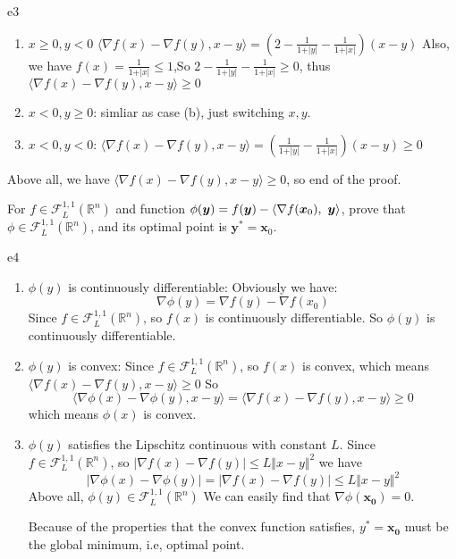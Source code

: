 \documentclass{article}
\newcommand{\xB}{\bm{x}}
\newcommand{\yB}{\bm{y}}
\newcommand{\RBB}{\mathbb{R}}
\newcommand{\FM}{\mathcal{F}}
\newcommand{\functiontype}[3]{\FM_{#1}^{#2,#3}(\RBB^n)}
\begin{document}
\begin{PROOF}{e3}
\begin{enumerate}
\begin{enumerate}
		\item $x\ge 0,y<0$
		$\langle\nabla f(x)-\nabla f(y),x-y\rangle=(2-\frac{1}{1+\vert y\vert}-\frac{1}{1+\vert x\vert})(x-y)$
		Also, we have $f(x)=\frac{1}{1+\vert x\vert}\le 1$,So $2-\frac{1}{1+\vert y\vert}-\frac{1}{1+\vert x\vert}\ge 0$, thus $\langle\nabla f(x)-\nabla f(y),x-y\rangle\ge 0$
		\item $x<0,y\ge 0$: simliar as case (b), just switching $x,y$.
		\item $x<0,y<0$:
		$\langle\nabla f(x)-\nabla f(y),x-y\rangle=(\frac{1}{1+\vert y\vert}-\frac{1}{1+\vert x\vert})(x-y)\ge 0$
	\end{enumerate}
	Above all, we have $\langle\nabla f(x)-\nabla f(y),x-y\rangle\ge 0$, so end of the proof.
\end{enumerate}
\end{PROOF}

\begin{excercise}\label{e4}
For $f \in \functiontype{L}{1}{1}$ and function $\phi(\yB) = f(\yB) - \innerproduct{\nabla f(\xB_0)}{\yB}$, prove that $\phi \in \functiontype{L}{1}{1}$, and its optimal point is $\yB^* = \xB_0$.
\end{excercise}
\begin{PROOF}{e4}
	\begin{enumerate}
		\item $\phi (y)$ is continuously differentiable:
		Obviously we have:
		\begin{equation}
			\nabla \phi(y)=\nabla f(y)-\nabla f(x_0)
		\end{equation}
		Since $f\in \mathcal{F}_{L}^{1,1}(\mathbb{R}^n)$, so $f(x)$ is continuously differentiable.
		So $\phi (y)$ is continuously differentiable.
		\item $\phi (y)$ is convex:
		Since $f\in \mathcal{F}_{L}^{1,1}(\mathbb{R}^n)$, so $f(x)$ is convex, which means $\langle\nabla f(x)-\nabla f(y),x-y\rangle\ge 0$
		So 
		\begin{equation}
			\langle\nabla \phi(x)-\nabla \phi(y),x-y\rangle=\langle\nabla f(x)-\nabla f(y),x-y\rangle\ge 0
		\end{equation}
		which means $\phi (x)$ is convex.
		\item $\phi(y)$ satisfies the Lipschitz continuous with constant $L$.
		Since $f\in \mathcal{F}_{L}^{1,1}(\mathbb{R}^n)$, so $\vert \nabla f(x)-\nabla f(y)\vert \le L\Vert x-y\Vert ^2$
		we have 
		\begin{equation}
			\vert \nabla \phi(x)-\nabla \phi(y)\vert=\vert \nabla f(x)-\nabla f(y)\vert \le L\Vert x-y\Vert ^2
		\end{equation}
		Above all, $\phi(y)\in \mathcal{F}_L^{1,1}(\mathbb{R}^n)$
		We can easily find that $\nabla \phi(\bm{x_0})=0$. 
		
		Because of the properties that the convex function satisfies, $y^*=\bm{x_0}$ must be the global minimum, i.e, optimal point. 
	\end{enumerate}
\end{PROOF}
\end{document}
